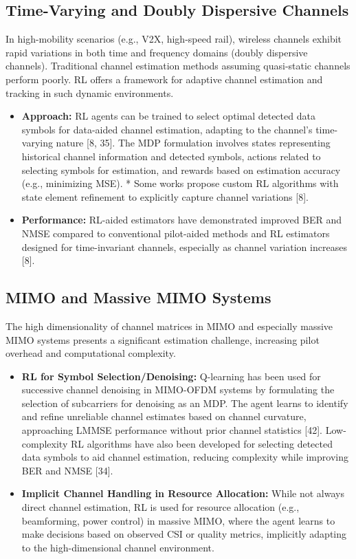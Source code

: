 \documentclass[journal,twocolumn]{IEEEtran}
\begin{document}
\subsection{Time-Varying and Doubly Dispersive Channels}
In high-mobility scenarios (e.g., V2X, high-speed rail), wireless channels exhibit rapid variations in both time and frequency domains (doubly dispersive channels). Traditional channel estimation methods assuming quasi-static channels perform poorly.
RL offers a framework for adaptive channel estimation and tracking in such dynamic environments.
\begin{itemize}
    \item \textbf{Approach:} RL agents can be trained to select optimal detected data symbols for data-aided channel estimation, adapting to the channel's time-varying nature [8, 35]. The MDP formulation involves states representing historical channel information and detected symbols, actions related to selecting symbols for estimation, and rewards based on estimation accuracy (e.g., minimizing MSE).
    * Some works propose custom RL algorithms with state element refinement to explicitly capture channel variations [8].
    \item \textbf{Performance:} RL-aided estimators have demonstrated improved BER and NMSE compared to conventional pilot-aided methods and RL estimators designed for time-invariant channels, especially as channel variation increases [8].
\end{itemize}

\subsection{MIMO and Massive MIMO Systems}
The high dimensionality of channel matrices in MIMO and especially massive MIMO systems presents a significant estimation challenge, increasing pilot overhead and computational complexity.
\begin{itemize}
    \item \textbf{RL for Symbol Selection/Denoising:} Q-learning has been used for successive channel denoising in MIMO-OFDM systems by formulating the selection of subcarriers for denoising as an MDP. The agent learns to identify and refine unreliable channel estimates based on channel curvature, approaching LMMSE performance without prior channel statistics [42]. Low-complexity RL algorithms have also been developed for selecting detected data symbols to aid channel estimation, reducing complexity while improving BER and NMSE [34].
    \item \textbf{Implicit Channel Handling in Resource Allocation:} While not always direct channel estimation, RL is used for resource allocation (e.g., beamforming, power control) in massive MIMO, where the agent learns to make decisions based on observed CSI or quality metrics, implicitly adapting to the high-dimensional channel environment.
\end{itemize}
\end{document}
